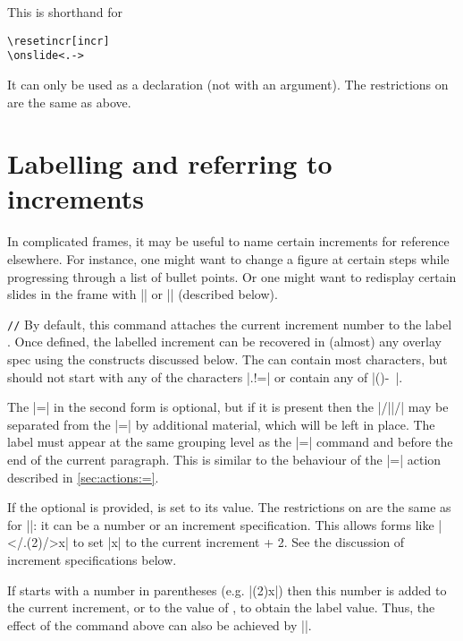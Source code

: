 \documentclass[a4paper]{ltxdoc}
\begin{document}
\begin{command}{\fromincr{}}
  This is shorthand for
\begin{verbatim}
\resetincr[incr]
\onslide<.->
\end{verbatim}
It can only be used as a declaration (not with an argument).  The restrictions
on  are the same as above.  
\end{command}


\section{Labelling and referring to increments}\label{sec:labels}

In complicated frames, it may be useful to name certain increments for reference
elsewhere.  For instance, one might want to change a figure at certain steps
while progressing through a list of bullet points.  Or one might want to
redisplay certain slides in the frame with |\afterframe| or |\handoutframe|
(described below).

\begin{command}{\incrlabel{}}
\end{command}
\begin{command}{\incrlabel{}\opt{\meta{=}}\texttt{/}\texttt{/}}
  By default, this command attaches the current increment number to the label
  .  Once defined, the labelled increment can be recovered in
  (almost) any overlay spec using the constructs discussed below.  The
   can contain most characters, but should not start with any of the
  characters |.!=| or contain any of |()-~|.

  The |=| in the second form is optional, but if it is present then the
  |/||/| may be separated from the |=| by additional material, which
  will be left in place.  The label must appear at the same grouping
  level as the |\incrlabel=| command and before the end of the current paragraph.
  This is similar to the behaviour of the |=| action described in
  \cref{sec:actions:=}.

  If the optional  is provided,  is set to its value.
  The restrictions on  are the same as for |\resetincr|: it can be a
  number or an increment specification.  This allows forms like
  |\incrlabel</.(2)/>{x}| to set |x| to the current increment + 2.  See the
  discussion of increment specifications below.

  If  starts with a number in parentheses (e.g. |(2)x|) then this
  number is added to the current increment, or to the value of ,
  to obtain the label value.  Thus, the effect of the command above can also be
  achieved by ||.  
\end{command}
\end{document}
